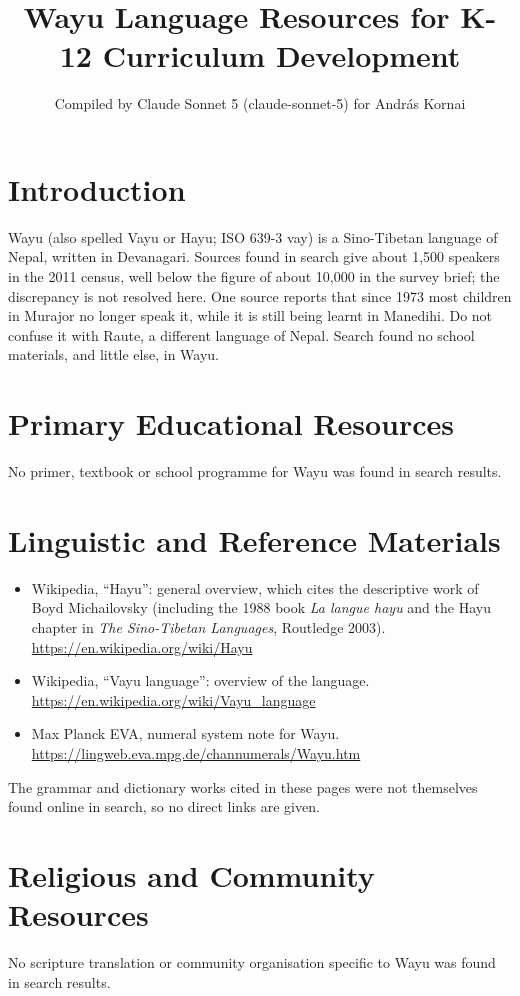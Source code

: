 \documentclass[12pt]{article}
\title{Wayu Language Resources for K-12 Curriculum Development}
\author{Compiled by Claude Sonnet 5 (claude-sonnet-5) for Andr\'as Kornai}
\date{}
\begin{document}
\maketitle

\section{Introduction}
Wayu (also spelled Vayu or Hayu; ISO 639-3 vay) is a Sino-Tibetan language of Nepal, written in Devanagari. Sources found in search give about 1,500 speakers in the 2011 census, well below the figure of about 10,000 in the survey brief; the discrepancy is not resolved here. One source reports that since 1973 most children in Murajor no longer speak it, while it is still being learnt in Manedihi. Do not confuse it with Raute, a different language of Nepal. Search found no school materials, and little else, in Wayu.

\section{Primary Educational Resources}
No primer, textbook or school programme for Wayu was found in search results.

\section{Linguistic and Reference Materials}
\begin{itemize}
\item Wikipedia, ``Hayu'': general overview, which cites the descriptive work of Boyd Michailovsky (including the 1988 book \emph{La langue hayu} and the Hayu chapter in \emph{The Sino-Tibetan Languages}, Routledge 2003). \url{https://en.wikipedia.org/wiki/Hayu}
\item Wikipedia, ``Vayu language'': overview of the language. \url{https://en.wikipedia.org/wiki/Vayu_language}
\item Max Planck EVA, numeral system note for Wayu. \url{https://lingweb.eva.mpg.de/channumerals/Wayu.htm}
\end{itemize}
The grammar and dictionary works cited in these pages were not themselves found online in search, so no direct links are given.

\section{Religious and Community Resources}
No scripture translation or community organisation specific to Wayu was found in search results.
\end{document}
